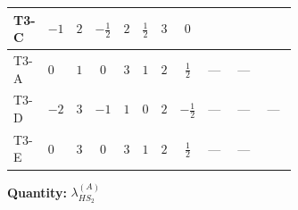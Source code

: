\documentclass[8pt]{article}
\begin{document}
\begin{landscape}
\begin{longtable}{@{}llcccccc >{\raggedright\arraybackslash}p{0.21\linewidth} >{\raggedright\arraybackslash}p{0.21\linewidth} >{\raggedright\arraybackslash}p{0.21\linewidth}@{}}
\midrule
T3-C & $-1$ & $2$ & $-\frac{1}{2}$ & $2$ & $\frac{1}{2}$ & $3$ & $0$ & \scriptsize\adjustbox{max width=\linewidth}{$\begin{gathered} -9 {g_2}^2 {\lambda_{HS_2}^{(A)}}\end{gathered}$} & \scriptsize\adjustbox{max width=\linewidth}{$\begin{gathered} +{\lambda_{12}^{(A)}} {\lambda_{HS_1}^{(A)}}\end{gathered}$} & \scriptsize\adjustbox{max width=\linewidth}{$\begin{gathered} +2 {\lambda_1} {\lambda_{HS_2}^{(A)}}\end{gathered}$} \\
\midrule
T3-A & $0$ & $1$ & $0$ & $3$ & $1$ & $2$ & $\frac{1}{2}$ & --- & --- & \scriptsize\adjustbox{max width=\linewidth}{$\begin{gathered} +2 {\lambda_1} {\lambda_{HS_2}^{(A)}}\end{gathered}$} \\
\midrule
T3-D & $-2$ & $3$ & $-1$ & $1$ & $0$ & $2$ & $-\frac{1}{2}$ & --- & --- & --- \\
\midrule
T3-E & $0$ & $3$ & $0$ & $3$ & $1$ & $2$ & $\frac{1}{2}$ & --- & --- & \scriptsize\adjustbox{max width=\linewidth}{$\begin{gathered} +2 {\lambda_1} {\lambda_{HS_2}^{(A)}}\end{gathered}$} \\
\midrule
\bottomrule
\end{longtable}
\clearpage
\noindent\textbf{Quantity: }$\lambda_{HS_2}^{(A)}$\par\smallskip

\end{landscape}
\end{document}
